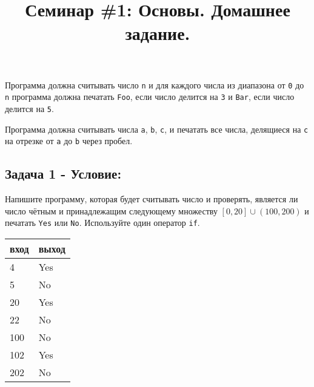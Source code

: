 \documentclass{article}
\begin{document}

\title{Семинар \#1: Основы. Домашнее задание.\vspace{-5ex}}\date{}\maketitle

Программа должна считывать число \texttt{n} и для каждого числа из диапазона от \texttt{0} до \texttt{n} программа должна печатать \texttt{Foo}, если число делится на \texttt{3} и \texttt{Bar}, если число делится на \texttt{5}.


Программа должна считывать числа \texttt{a}, \texttt{b}, \texttt{c}, и печатать все числа, делящиеся на \texttt{c} на отрезке от \texttt{a} до \texttt{b} через пробел.

\subsection*{Задача 1 - Условие:} 
Напишите программу, которая будет считывать число и проверять, является ли число чётным и принадлежащим следующему множеству 
$[0, 20] \cup (100, 200)$ и печатать \texttt{Yes} или \texttt{No}. Используйте один оператор \texttt{if}.
\begin{center}
\begin{tabular}{ l l }
 вход & выход \\ \hline
 4 & Yes  \\ 
 5 & No  \\ 
 20 & Yes \\ 
 22 & No \\  
 100 & No \\
 102 & Yes \\    
 202 & No \\  
\end{tabular}
\end{center}
\end{document}
